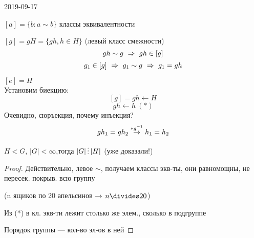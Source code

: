\documentclass[main]{subfiles}
\begin{document}
\begin{lect}{2019-09-17}
    \begin{definition}
        $[a] = \{b:a  \sim b\}$ классы эквивалентности
    \end{definition}

    \begin{definition}
        $[g] = g H = \{g h, h \in H \}$ (левый класс смежности)
        \[g h \sim g \ \Rightarrow\  g h \in [g]\]
        \[g_1 \in [g] \ \Rightarrow\  g_1 \sim g \ \Rightarrow\  g_1 = g h\]
    \end{definition}

    \begin{utv}
        $[e]=H$\\
        Установим биекцию:
        \[[g]=gh \leftarrow H\]
        \[gh \leftarrow h \ (*)\]
        Очевидно, сюръекция, почему инъекция?
        \[g h_1 = g h_2 \overset{*g^{-1}}{\rightarrow} h_1 = h_2\]
    \end{utv}

    \begin{theorem}[Лагранжа]
        $H < G$, \q $|G| < \infty$,\q тогда $|G| \devides |H|$ (уже доказали!)
    \end{theorem}

    \begin{proof}
        Действительно, левое $\sim$, получаем классы экв-ты, они равномощны, не пересек. покрыв. всю группу

        (n ящиков по 20 апельсинов $\rightarrow$ $n \divides 20$)

        Из (*) в кл. экв-ти лежит столько же элем., сколько в подгруппе

        Порядок группы --- кол-во эл-ов в ней
    \end{proof}
\end{lect}
\end{document}
